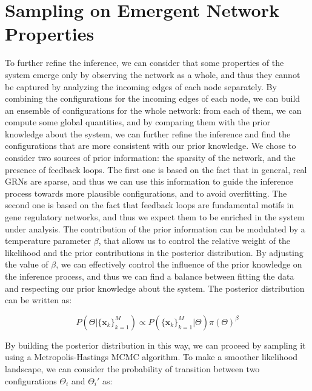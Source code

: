 \documentclass[10pt, aps, rmp,  twocolumn, superscriptaddress, floatfix, showkeys]{revtex4-2}
\begin{document}
\section{Sampling on Emergent Network Properties}
 
To further refine the inference, we can consider that some properties of the system emerge only by observing the network as a whole, and thus they cannot be captured by analyzing the incoming edges of each node separately. By combining the configurations for the incoming edges of each node, we can build an ensemble of configurations for the whole network: from each of them, we can compute some global quantities, and by comparing them with the prior knowledge about the system, we can further refine the inference and find the configurations that are more consistent with our prior knowledge.
We chose to consider two sources of prior information: the sparsity of the network, and the presence of feedback loops. The first one is based on the fact that in general, real GRNs are sparse, and thus we can use this information to guide the inference process towards more plausible configurations, and to avoid overfitting. The second one is based on the fact that feedback loops are fundamental motifs in gene regulatory networks, and thus we expect them to be enriched in the system under analysis. 
The contribution of the prior information can be modulated by a temperature parameter $\beta$, that allows us to control the relative weight of the likelihood and the prior contributions in the posterior distribution. By adjusting the value of $\beta$, we can effectively control the influence of the prior knowledge on the inference process, and thus we can find a balance between fitting the data and respecting our prior knowledge about the system. The posterior distribution can be written as:

\begin{equation}
    P(\Theta|\{\mathbf{x}_k\}_{k=1}^M) \propto P(\{\mathbf{x}_k\}_{k=1}^M|\Theta) \pi(\Theta)^\beta
\end{equation}

By building the posterior distribution in this way, we can proceed by sampling it using a Metropolis-Hastings MCMC algorithm. To make a smoother likelihood landscape, we can consider the probability of transition between two configurations $\Theta_i$ and $\Theta_i'$ as:
\end{document}
